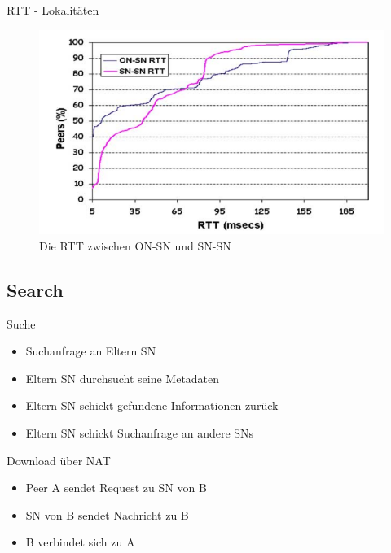 \documentclass[ucs,9pt]{beamer}
\begin{document}
\begin{frame}{RTT - Lokalitäten}
\begin{figure}
\includegraphics[scale=0.4]{images/rttSns}
\caption{Die RTT zwischen ON-SN und SN-SN}
\end{figure}
\end{frame}

\subsection{Search}

\begin{frame}{Suche}
\begin{itemize}
\item Suchanfrage an Eltern SN
\item Eltern SN durchsucht seine Metadaten
\item Eltern SN schickt gefundene Informationen zurück
\item Eltern SN schickt Suchanfrage an andere SNs
\end{itemize}
\end{frame}

\begin{frame}{Download über NAT}
\begin{itemize}
\item Peer A sendet Request zu SN von B
\item SN von B sendet Nachricht zu B 
\item B verbindet sich zu A
\end{itemize}
\end{frame}
\end{document}
